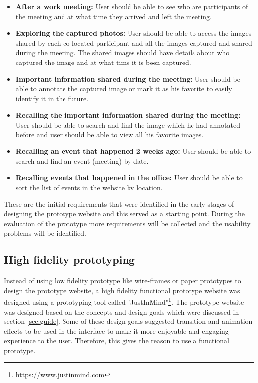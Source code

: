 \documentclass[mscthesis]{usiinfthesis}
\begin{document}
\begin{itemize}
\item \textbf{After a work meeting:}
User should be able to see who are participants of the meeting and at what time they arrived and left the meeting. 
\item \textbf{Exploring the captured photos:}
User should be able to access the images shared by each co-located participant and all the images captured and shared during the meeting. The shared images should have details about who captured the image and at what time it is been captured.
\item \textbf{Important information shared during the meeting:}
User should be able to annotate the captured image or mark it as his favorite to easily identify it in the future.
\item \textbf{Recalling the important information shared during the meeting:}
User should be able to search and find the image which he had annotated before and user should be able to view all his favorite images. 
\item \textbf{Recalling an event that happened 2 weeks ago:}
User should be able to search and find an event (meeting) by date. 
\item \textbf{Recalling events that happened in the office:}
User should be able to sort the list of events in the website by location.
\end{itemize}

These are the initial requirements that were identified in the early stages of designing the prototype website and this served as a starting point. During the evaluation of the prototype more requirements will be collected and the usability problems will be identified.

\subsection{High fidelity prototyping}

Instead of using low fidelity prototype like wire-frames or paper prototypes to design the prototype website, a high fidelity functional prototype website was designed using a prototyping tool called "JustInMind"\footnote{\url{https://www.justinmind.com}}. The prototype website was designed based on the concepts and design goals which were discussed in section \ref{sec:guide}. Some of these design goals suggested transition and animation effects to be used in the interface to make it more enjoyable and engaging experience to the user. Therefore, this gives the reason to use a functional prototype. 
\end{document}
